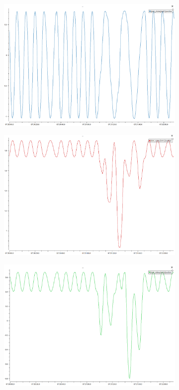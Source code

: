 \begin{figure}
  \centering
  \captionsetup{justification=centering}
  \begin{subfigure}[b]{0.4\linewidth}
    \label{subfig:top_view}
    \includegraphics[width=\linewidth]{reaction_joint1.png}
     \caption{}
  \end{subfigure}
  \begin{subfigure}[b]{0.4\linewidth}
    \includegraphics[width=\linewidth]{reaction_joint2.png}
    \caption{}
  \end{subfigure}
  \begin{subfigure}[b]{0.4\linewidth}
    \includegraphics[width=\linewidth]{reaction_joint3.png}

\end{subfigure}
\end{figure}
